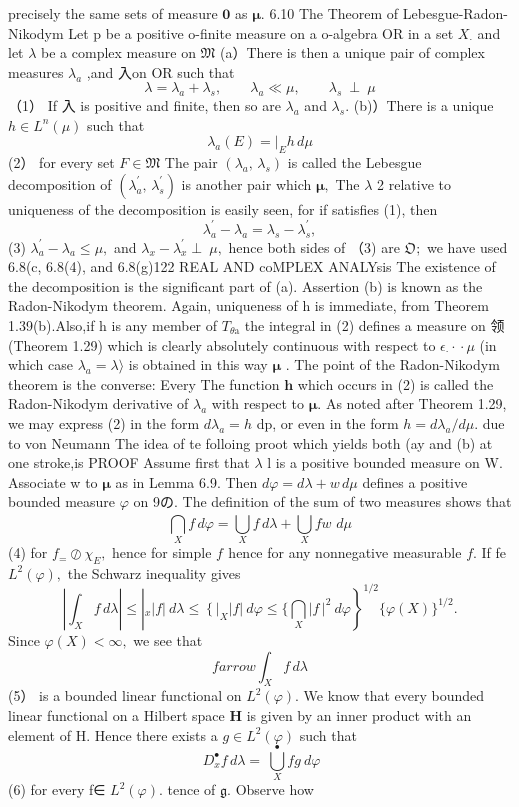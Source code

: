 precisely the same sets of measure $\mathbf{0}$ as ${\boldsymbol{\mu}}.$ 6.10 The Theorem of Lebesgue-Radon-Nikodym Let p be a positive o-finite measure on a o-algebra OR in a set $X_{\cdot}$ and let $\lambda$ be a complex measure on ${\mathfrak{M}}$ (a）There is then a unique pair of complex measures $\lambda_{a}$ ,and 入on OR such that $$ \lambda=\lambda_{a}+\lambda_{s},\qquad\lambda_{a}\ll\mu,\qquad\lambda_{s}\ \perp\ \mu $$ （1） If 入 is positive and finite, then so are $\lambda_{a}$ and $\lambda_{s}.$ (b)）There is a unique $h\in L^{n}(\mu)$ such that $$ \lambda_{a}(E)=\left.\right|_{E}h\,d\mu $$ (2） for every set $F\in{\mathfrak{M}}$ The pair $(\lambda_{a},\,\lambda_{s})$ is called the Lebesgue decomposition of $(\lambda_{a}^{\prime},\,\lambda_{s}^{\prime})$ is another pair which ${\boldsymbol{\mu}},$ The $\lambda$ 2 relative to uniqueness of the decomposition is easily seen, for if satisfies (1), then $$ \lambda_{a}^{\prime}-\lambda_{a}=\lambda_{s}-\lambda_{s}^{\prime}, $$ (3) $\lambda_{a}^{\prime}-\lambda_{a}\leqslant\mu,$ and $\lambda_{x}-\lambda_{x}^{\prime}\perp\ \mu,$ hence both sides of （3) are ${\mathfrak{O}};$ we have used 6.8(c, 6.8(4), and 6.8(g)122 REAL AND coMPLEX ANALYsis The existence of the decomposition is the significant part of (a). Assertion (b) is known as the Radon-Nikodym theorem. Again, uniqueness of h is immediate, from Theorem 1.39(b).Also,if h is any member of $\scriptstyle T_{\theta\mathrm{{a}}}$ the integral in (2) defines a measure on 领(Theorem 1.29) which is clearly absolutely continuous with respect to $\scriptstyle\epsilon_{\cdot}\!\cdot\!\cdot\!\mu$ (in which case $\lambda_{a}=\lambda\rangle$ is obtained in this way ${\boldsymbol{\mu}}$ . The point of the Radon-Nikodym theorem is the converse: Every The function ${\boldsymbol{h}}$ which occurs in (2) is called the Radon-Nikodym derivative of $\lambda_{a}$ with respect to ${\boldsymbol{\mu}}.$ As noted after Theorem 1.29, we may express (2) in the form $d\lambda_{a}=h$ dp, or even in the form $h=d\lambda_{a}/d\mu.$ due to von Neumann The idea of te folloing proot which yields both (ay and (b) at one stroke,is PROOF Assume first that $\lambda$ l is a positive bounded measure on W. Associate w to $\boldsymbol{\mu}$ as in Lemma 6.9. Then $d\varphi=d\lambda+w\,d\mu$ defines a positive bounded measure $\varphi$ on 9の. The definition of the sum of two measures shows that $$ \bigcap_{X}f\,d\varphi=\bigcup_{X}f\,d\lambda+\bigcup_{X}^{}f w\,\,d\mu $$ (4) for $f_{=}\oslash\chi_{E},$ hence for simple $f_{}^{}$ hence for any nonnegative measurable $f.$ If fe $L^{2}(\varphi),$ the Schwarz inequality gives $$ \left|\int_{X}f\,d\lambda\right|\leq\left|_{x}|f|\ d\lambda\leq\left\{\right|_{X}|f|\ d\varphi\leq \{\bigcap_{X}|f\,|^{2}\ d\varphi\right\}^{1/2}\{\varphi(X)\}^{1/2}. $$ Since $\varphi(X)<\infty,$ we see that $$ f{ arrow}\int_{X}f\,d\lambda $$ (5） is a bounded linear functional on $L^{2}(\varphi).$ We know that every bounded linear functional on a Hilbert space ${\boldsymbol{H}}$ is given by an inner product with an element of H. Hence there exists a $g\in L^{2}(\varphi)$ such that $$ \ D_{x}^{\bullet}f\,d\lambda=\ {\stackrel{\bullet}{\bigcup_{X}}}f g\ d\varphi $$ (6) for every f∈ $L^{2}(\varphi).$ tence of ${\mathfrak{g}}.$ Observe how 